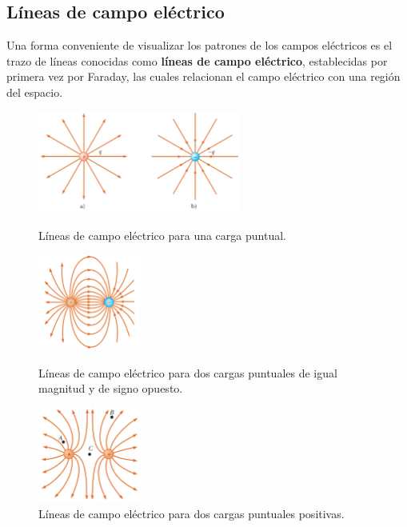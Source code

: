     \subsection{Líneas de campo eléctrico}
      \PN Una forma conveniente de visualizar los patrones de los campos eléctricos es el trazo de líneas conocidas
      como \textbf{líneas de campo eléctrico}, establecidas por primera vez por Faraday, las cuales relacionan el campo
      eléctrico con una región del espacio.

      \begin{figure}[H]
        \centering
        \includegraphics[width=0.6\textwidth]{4/figure_3}
        \caption{Líneas de campo eléctrico para una carga puntual.}

        \begin{multicols}{2}
          \includegraphics[width=0.3\textwidth]{4/figure_4}\par
          \caption{Líneas de campo eléctrico para dos cargas puntuales de igual magnitud y de signo opuesto.}
          \includegraphics[width=0.3\textwidth]{4/figure_5}\par
          \caption{Líneas de campo eléctrico para dos cargas puntuales positivas.}
        \end{multicols}
      \end{figure}

